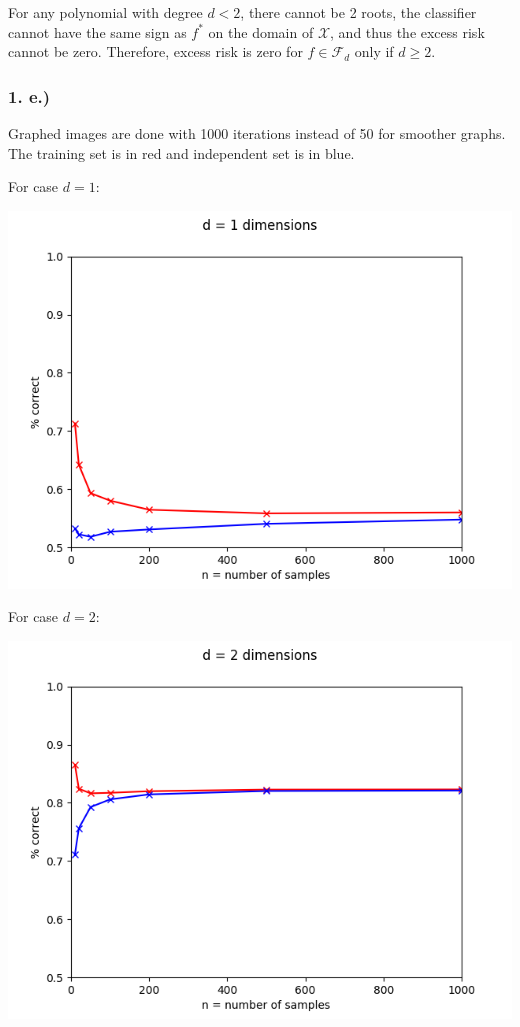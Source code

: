 \documentclass{article}
\begin{document}
For any polynomial with degree $d < 2$, there cannot be 2 roots, the classifier cannot have the same sign as $f^*$ on the domain of $\mathcal{X}$, and thus the excess risk cannot be zero. Therefore, excess risk is zero for $f\in\mathcal{F}_d$ only if $d\geq 2$.

\pagebreak
\subsubsection*{1. e.)}

Graphed images are done with 1000 iterations instead of 50 for smoother graphs. The training set is in red and independent set is in blue.

For case $d = 1$:

\begin{center}\includegraphics[scale=0.8]{dequals1}\end{center}

For case $d = 2$:

\begin{center}\includegraphics[scale=0.8]{dequals2}\end{center}
\end{document}
